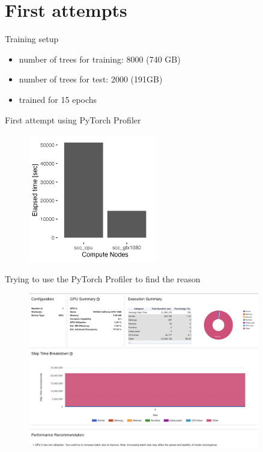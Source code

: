 \documentclass[compress,aspectratio=169]{beamer}
\begin{document}
\section{First attempts}

\begin{frame}{Training setup}
\begin{itemize}
    \item number of trees for training: 8000 (740 GB)
    \item number of trees for test: 2000 (191GB)
    \item trained for 15 epochs
\end{itemize}
\end{frame}


\begin{frame}{First attempt using PyTorch Profiler}
    \begin{center}
    \begin{figure}
        \includegraphics[width=0.5\textwidth]{../../data/sacct_barplot_by_nodes_profiler-torch_sample-points}
    \end{figure}
    \end{center}
\end{frame}

\begin{frame}{Trying to use the PyTorch Profiler to find the reason}
	\vspace{-1em}
    \begin{center}
    \begin{figure}
        \includegraphics[width=0.9\textwidth]{../../data/scap_gtx1080_profiler-torch_sample-points_14650750}
    \end{figure}
    \end{center}
\end{frame}
\end{document}
